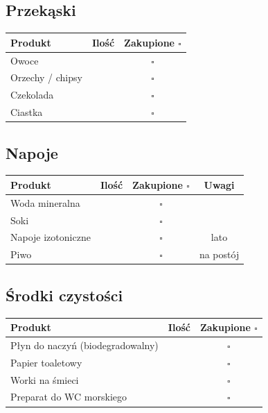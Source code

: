\documentclass[a4paper,11pt]{article}
\begin{document}
\vspace{0.3cm}

\subsection*{Przekąski}
\begin{tabularx}{\linewidth}{|X|c|c|}
\hline
\textbf{Produkt} & \textbf{Ilość} & \textbf{Zakupione \(\square\)} \\
\hline
Owoce & & \(\square\) \\[4pt]\hline
Orzechy / chipsy & & \(\square\) \\[4pt]\hline
Czekolada & & \(\square\) \\[4pt]\hline
Ciastka & & \(\square\) \\[4pt]\hline
\end{tabularx}

\vspace{0.3cm}

\subsection*{Napoje}
\begin{tabularx}{\linewidth}{|X|c|c|c|}
\hline
\textbf{Produkt} & \textbf{Ilość} & \textbf{Zakupione \(\square\)} & \textbf{Uwagi} \\
\hline
Woda mineralna & & \(\square\) & \\[4pt]\hline
Soki & & \(\square\) & \\[4pt]\hline
Napoje izotoniczne & & \(\square\) & lato \\[4pt]\hline
Piwo & & \(\square\) & na postój \\[4pt]\hline
\end{tabularx}

\vspace{0.3cm}

\subsection*{Środki czystości}
\begin{tabularx}{\linewidth}{|X|c|c|}
\hline
\textbf{Produkt} & \textbf{Ilość} & \textbf{Zakupione \(\square\)} \\
\hline
Płyn do naczyń (biodegradowalny) & & \(\square\) \\[4pt]\hline
Papier toaletowy & & \(\square\) \\[4pt]\hline
Worki na śmieci & & \(\square\) \\[4pt]\hline
Preparat do WC morskiego & & \(\square\) \\[4pt]\hline
\end{tabularx}
\end{document}
